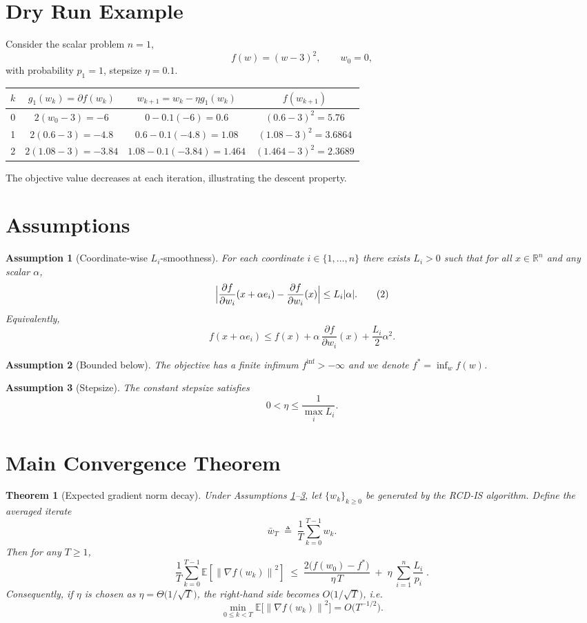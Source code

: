 \documentclass{article}
\newtheorem{theorem}{Theorem}
\newtheorem{assumption}{Assumption}
\newcommand{\EE}{\mathbb{E}}
\newcommand{\RR}{\mathbb{R}}
\newcommand{\norm}[1]{\left\lVert #1\right\rVert}
\begin{document}
\section*{Dry Run Example}
Consider the scalar problem $n=1$,
\[
f(w)=(w-3)^2,\qquad w_0=0,
\]
with probability $p_1=1$, stepsize $\eta=0.1$.

\begin{tabular}{c|c|c|c}
$k$ & $g_{1}(w_k)=\partial f(w_k)$ & $w_{k+1}=w_k-\eta g_{1}(w_k)$ & $f(w_{k+1})$\\\hline
0 & $2(w_0-3)=-6$ & $0-0.1(-6)=0.6$ & $(0.6-3)^2=5.76$\\
1 & $2(0.6-3)=-4.8$ & $0.6-0.1(-4.8)=1.08$ & $(1.08-3)^2=3.6864$\\
2 & $2(1.08-3)=-3.84$ & $1.08-0.1(-3.84)=1.464$ & $(1.464-3)^2=2.3689$\\
\end{tabular}
The objective value decreases at each iteration, illustrating the descent property.

\newpage
\section*{Assumptions}
\begin{assumption}[Coordinate‑wise $L_i$‑smoothness]\label{ass:smooth}
For each coordinate $i\in\{1,\dots,n\}$ there exists $L_i>0$ such that for all $x\in\RR^n$ and any scalar $\alpha$,
\[
\Bigl| \frac{\partial f}{\partial w_i}(x+\alpha e_i)-\frac{\partial f}{\partial w_i}(x) \Bigr|
\le L_i |\alpha|.
\tag{2}
\]
Equivalently,
\[
f(x+\alpha e_i)\le f(x)+\alpha\,\frac{\partial f}{\partial w_i}(x)+\frac{L_i}{2}\alpha^2 .
\tag{3}
\]
\end{assumption}
\begin{assumption}[Bounded below]\label{ass:lower}
The objective has a finite infimum $f^{\inf}>-\infty$ and we denote $f^{*}= \inf_{w} f(w)$.
\end{assumption}
\begin{assumption}[Stepsize]\label{ass:stepsize}
The constant stepsize satisfies 
\[
0<\eta\le \frac{1}{\max_{i}L_i}.
\tag{4}
\]
\end{assumption}

\section*{Main Convergence Theorem}
\begin{theorem}[Expected gradient norm decay]\label{thm:main}
Under Assumptions \ref{ass:smooth}–\ref{ass:stepsize}, let $\{w_k\}_{k\ge0}$ be generated by the RCD‑IS algorithm. Define the averaged iterate
\[
\bar w_T \;\triangleq\; \frac{1}{T}\sum_{k=0}^{T-1} w_k .
\]
Then for any $T\ge 1$,
\[
\frac{1}{T}\sum_{k=0}^{T-1}\EE\!\left[\norm{\nabla f(w_k)}^{2}\right]
\;\le\;
\frac{2\bigl(f(w_0)-f^{*}\bigr)}{\eta\,T}
\;+\;
\eta\;\sum_{i=1}^{n}\frac{L_i}{p_i}\; .
\tag{5}
\]
Consequently, if $\eta$ is chosen as $\eta = \Theta\!\bigl(1/\sqrt{T}\bigr)$, the right‑hand side becomes $O\!\bigl(1/\sqrt{T}\bigr)$, i.e.
\[
\min_{0\le k<T}\EE\!\bigl[\norm{\nabla f(w_k)}^{2}\bigr]=O\!\bigl(T^{-1/2}\bigr).
\]
\end{theorem}
\end{document}
